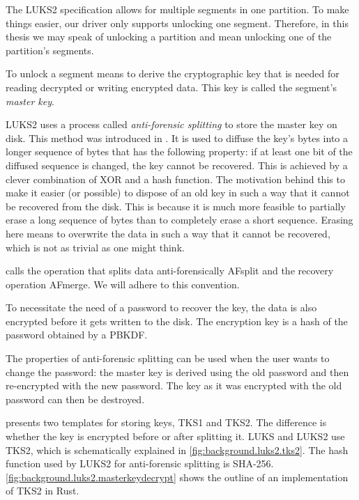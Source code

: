 The LUKS2 specification allows for multiple segments in one partition. To make things easier, our driver only supports unlocking one segment. Therefore, in this thesis we may speak of unlocking a partition and mean unlocking one of the partition's segments.

To unlock a segment means to derive the cryptographic key that is needed for reading decrypted or writing encrypted data. This key is called the segment's \emph{master key}.

LUKS2 uses a process called \emph{anti-forensic splitting} to store the master key on disk. This method was introduced in \cite{Fruhwirth2005}. It is used to diffuse the key's bytes into a longer sequence of bytes that has the following property: if at least one bit of the diffused sequence is changed, the key cannot be recovered. This is achieved by a clever combination of XOR and a hash function. The motivation behind this to make it easier (or possible) to dispose of an old key in such a way that it cannot be recovered from the disk. This is because it is much more feasible to partially erase a long sequence of bytes than to completely erase a short sequence. Erasing here means to overwrite the data in such a way that it cannot be recovered, which is not as trivial as one might think.

\cite{Fruhwirth2005} calls the operation that splits data anti-forensically AFsplit and the recovery operation AFmerge. We will adhere to this convention.

To necessitate the need of a password to recover the key, the data is also encrypted before it gets written to the disk. The encryption key is a hash of the password obtained by a PBKDF.

The properties of anti-forensic splitting can be used when the user wants to change the password: the master key is derived using the old password and then re-encrypted with the new password. The key as it was encrypted with the old password can then be destroyed.

\cite{Fruhwirth2005} presents two templates for storing keys, TKS1 and TKS2. The difference is whether the key is encrypted before or after splitting it. LUKS and LUKS2 use TKS2, which is schematically explained in \autoref{fig:background.luks2.tks2}. The hash function used by LUKS2 for anti-forensic splitting is SHA-256. \autoref{fig:background.luks2.masterkeydecrypt} shows the outline of an implementation of TKS2 in Rust.

